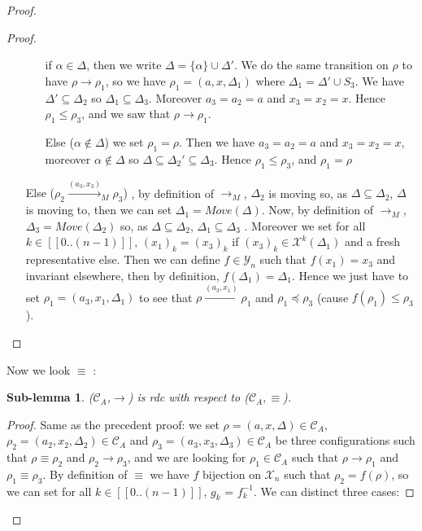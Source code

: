 \documentclass[a4paper,10pt]{report}
\newtheorem{slm}{Sub-lemma}[lm]
\newcommand{\seg}[1]{[\![#1]\!]}
\newcommand{\ts}{\seg{0 .. (n-1)}}
\newcommand{\C}{\mathcal{C}_{A}}
\newcommand{\Xa}{\mathcal{X}}
\newcommand{\X}{\mathcal{X}_{n}}
\newcommand{\Y}{\mathcal{Y}_{n}}
\begin{document}
\begin{proof}
\begin{proof}
\begin{itemize}
      \begin{itemize}
	\item [if $\alpha \in \Delta$,] then we write $\Delta = \{\alpha \} \cup \Delta'$.  
	We do the same transition on $\rho$ to have $\rho \rightarrow \rho_1$, so we have $\rho_1 = (a,x,\Delta_1)$ where $\Delta_1 = \Delta' \cup S_3$. 
	We have $\Delta' \subseteq \Delta_2$ so $\Delta_1 \subseteq \Delta_3$.
	Moreover $a_3= a_2 = a$ and $x_3 = x_2 = x$.
	Hence $\rho_1 \leq \rho_3$, and we saw that $\rho \rightarrow \rho_1$.
	\item [Else ($\alpha \notin \Delta$)] we set $\rho_1 = \rho$. Then we have $a_3= a_2 = a$ and $x_3 = x_2 = x$, moreover $\alpha \notin \Delta $ so $\Delta \subseteq \Delta_2' \subseteq \Delta_3$.
	Hence $\rho_1 \leq \rho_3$, and $\rho_1 = \rho$ 
      \end{itemize}
     \item [Else ($\rho_2 \xrightarrow{(a_3,x_3)}_{M} \rho_3$)],  
     by definition of $\rightarrow_{M}$, $\Delta_2$ is moving so, as $\Delta \subseteq \Delta_2$, $\Delta$ is moving to, then we can set $\Delta_1 = Move(\Delta)$.
     Now, by definition of $\rightarrow_{M}$, $\Delta_3 = Move(\Delta_2)$ so,
     as $\Delta \subseteq \Delta_2$, $\Delta_1 \subseteq \Delta_3$ .
     Moreover we set for all $k \in \ts$, ${(x_1)}_k = {(x_3)}_k$ if ${(x_3)}_k \in \Xa^k(\Delta_1)$ and a fresh representative else.
     Then we can define $f \in \Y$ such that $f(x_1) = x_3$ and invariant elsewhere, then by definition, $f(\Delta_1) = \Delta_1$.
     Hence we just have to set $\rho_1 = (a_3,x_1,\Delta_1)$ to see that $\rho \xrightarrow{(a_3,x_1)} \rho_1$ and $\rho_1 \preceq \rho_3$ (cause $f(\rho_1) \leq \rho_3$).
    \end{itemize}   
  \end{proof}
  Now we look $\equiv$ :
  \begin{slm}
    ($\C$,$\rightarrow$) is rdc with respect to ($\C,\equiv$).
  \end{slm}
  \begin{proof}
    Same as the precedent proof: we set $\rho = (a,x,\Delta) \in \C$, $\rho_2 = (a_2,x_2,\Delta_2) \in \C$ and $\rho_3 = (a_3,x_3,\Delta_3) \in \C$ be three configurations
   such that $\rho \equiv \rho_2$ and $\rho_2 \rightarrow \rho_3$, and we are looking for $\rho_1 \in \C$ such that $\rho \rightarrow \rho_1$  and $\rho_1 \equiv \rho_3$.
   By definition of $\equiv$ we have $f$ bijection on $\X$ such that $\rho_2 = f(\rho)$, so we can set for all $k \in \ts$, $g_k$ = $f_k^{-1}$.
   We can distinct three cases:

\end{proof}
\end{proof}
\end{document}
